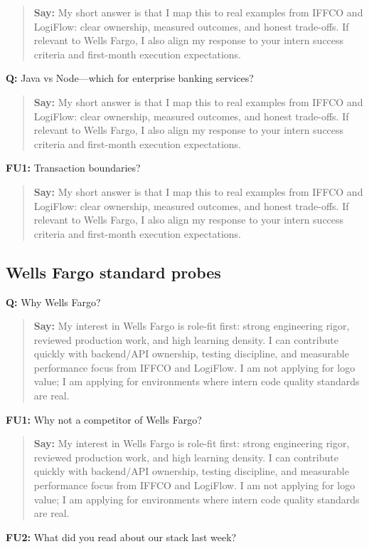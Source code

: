 \documentclass[9pt,a4paper]{article}
\begin{document}
\begin{quote}\small\textbf{Say:} My short answer is that I map this to real examples from IFFCO and LogiFlow: clear ownership, measured outcomes, and honest trade-offs. If relevant to Wells Fargo, I also align my response to your intern success criteria and first-month execution expectations.\end{quote}
\vspace{2mm}
\textbf{Q:} Java vs Node---which for enterprise banking services?

\begin{quote}\small\textbf{Say:} My short answer is that I map this to real examples from IFFCO and LogiFlow: clear ownership, measured outcomes, and honest trade-offs. If relevant to Wells Fargo, I also align my response to your intern success criteria and first-month execution expectations.\end{quote}
\vspace{2mm}
\textbf{FU1:} Transaction boundaries?

\begin{quote}\small\textbf{Say:} My short answer is that I map this to real examples from IFFCO and LogiFlow: clear ownership, measured outcomes, and honest trade-offs. If relevant to Wells Fargo, I also align my response to your intern success criteria and first-month execution expectations.\end{quote}
\vspace{2mm}
\subsection{Wells Fargo standard probes}
\textbf{Q:} Why Wells Fargo?

\begin{quote}\small\textbf{Say:} My interest in Wells Fargo is role-fit first: strong engineering rigor, reviewed production work, and high learning density. I can contribute quickly with backend/API ownership, testing discipline, and measurable performance focus from IFFCO and LogiFlow. I am not applying for logo value; I am applying for environments where intern code quality standards are real.\end{quote}
\vspace{2mm}
\textbf{FU1:} Why not a competitor of Wells Fargo?

\begin{quote}\small\textbf{Say:} My interest in Wells Fargo is role-fit first: strong engineering rigor, reviewed production work, and high learning density. I can contribute quickly with backend/API ownership, testing discipline, and measurable performance focus from IFFCO and LogiFlow. I am not applying for logo value; I am applying for environments where intern code quality standards are real.\end{quote}
\vspace{2mm}
\textbf{FU2:} What did you read about our stack last week?
\end{document}
